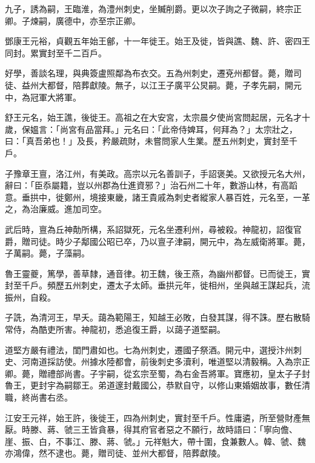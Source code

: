 \begin{pinyinscope}
 九子，誘為嗣，王臨淮，為澧州刺史，坐贓削爵。更以次子詢之子微嗣，終宗正卿。子煉嗣，廣德中，亦至宗正卿。



 鄧康王元裕，貞觀五年始王鄶，十一年徙王。始王及徙，皆與譙、魏、許、密四王同封。累實封至千二百戶。



 好學，善談名理，與典簽盧照鄰為布衣交。五為州刺史，遷兗州都督。薨，贈司徒、益州大都督，陪葬獻陵。無子，以江王子廣平公炅嗣。薨，子孝先嗣，開元中，為冠軍大將軍。



 舒王元名，始王譙，後徙王。高祖之在大安宮，太宗晨夕使尚宮問起居，元名才十歲，保媼言：「尚宮有品當拜。」元名曰：「此帝侍婢耳，何拜為？」太宗壯之，曰：「真吾弟也！」及長，矜嚴疏財，未嘗問家人生業。歷五州刺史，實封至千戶。



 子豫章王亶，洛江州，有美政。高宗以元名善訓子，手詔褒美。又欲授元名大州，辭曰：「臣忝屬籍，豈以州郡為仕進資邪？」治石州二十年，數游山林，有高蹈意。垂拱中，徙鄭州，境接東畿，諸王貴戚為刺史者縱家人暴百姓，元名至，一革之，為治廉威。進加司空。



 武后時，亶為丘神勣所構，系詔獄死，元名坐遷利州，尋被殺。神龍初，詔復官爵，贈司徒。時少子鄅國公昭已卒，乃以亶子津嗣，開元中，為左威衛將軍。薨，子萬嗣。薨，子藻嗣。



 魯王靈夔，篤學，善草隸，通音律。初王魏，後王燕，為幽州都督。已而徙王，實封至千戶。頻歷五州刺史，遷太子太師。垂拱元年，徙相州，坐與越王謀起兵，流振州，自殺。



 子詵，為清河王，早夭。藹為範陽王，知越王必敗，白發其謀，得不誅。歷右散騎常侍，為酷吏所害。神龍初，悉追復王爵，以藹子道堅嗣。



 道堅方嚴有禮法，閨門肅如也。七為州刺史，遷國子祭酒。開元中，選授汴州刺史、河南道採訪使。州據水陸都會，前後刺史多瀆利，唯道堅以清毅稱。入為宗正卿。薨，贈禮部尚書。子宇嗣，從玄宗至蜀，為右金吾將軍。寶應初，皇太子子封魯王，更封宇為嗣鄒王。弟道邃封戴國公，恭默自守，以修山東婚姻故事，數任清職，終尚書右丞。



 江安王元祥，始王許，後徙王，四為州刺史，實封至千戶。性庸遴，所至營財產無厭。時滕、蔣、虢三王皆貪暴，得其府官者惡之不願行，故時語曰：「寧向儋、崖、振、白，不事江、滕、蔣、虢。」元祥魁大，帶十圍，食兼數人。韓、虢、魏亦鴻偉，然不逮也。薨，贈司徒、並州大都督，陪葬獻陵。




\end{pinyinscope}
